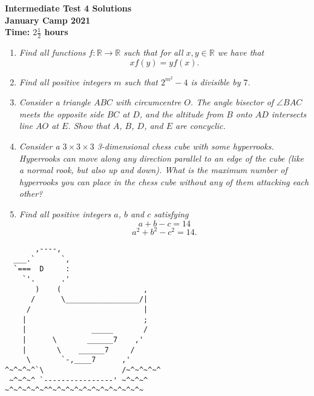 \documentclass{article}
\begin{document}
\thispagestyle{empty}

\begin{center}
  \textbf{\Large Intermediate Test 4 Solutions}
  \\ \vspace{1em}
  \textbf{\large January Camp 2021}
  \\ \vspace{1em}
  \textbf{\large Time: $2\frac{1}{2}$ hours}
\end{center}

\vspace{24pt}

\begin{enumerate}[1.]

\item %
{\itshape Find all functions $f : \mathbb{R} \to \mathbb{R}$ such that for all $x, y \in \mathbb{R}$ we have that
\[ xf(y) = yf(x). \]}


\item %
{\itshape Find all positive integers $m$ such that $2^{m^2}-4$ is divisible by $7$.}


\item %
{\itshape Consider a triangle $ABC$ with circumcentre $O$.
The angle bisector of $\angle BAC$ meets the opposite side $BC$ at $D$, and the altitude from $B$ onto $AD$ intersects line $AO$ at $E$.
Show that $A$, $B$, $D$, and $E$ are concyclic.}


\item %
{\itshape Consider a $3\times3\times3$ 3-dimensional chess cube with some hyperrooks.
Hyperrooks can move along any direction parallel to an edge of the cube (like a normal rook, but also up and down).
What is the maximum number of hyperrooks you can place in the chess cube without any of them attacking each other?}


\item %
{\itshape Find all positive integers $a$, $b$ and $c$ satisfying 
$$a + b - c = 14$$
$$a^2 + b^2 - c^2 = 14.$$}


\end{enumerate}

\vfill
\centering
\tiny
\begin{BVerbatim}
       ,----,
  ___.`      `,
  `===  D     :
    `'.      .'
       )    (                   ,
      /      \_________________/|
     /                          |
    |                           ;
    |               _____       /
    |      \       ______7    ,'
    |       \    ______7     /
     \       `-,____7      ,'   
^~^~^~^`\                  /~^~^~^~^
 ~^~^~^ `----------------' ~^~^~^
~^~^~^~^~^^~^~^~^~^~^~^~^~^~^~^~
\end{BVerbatim}
\end{document}
